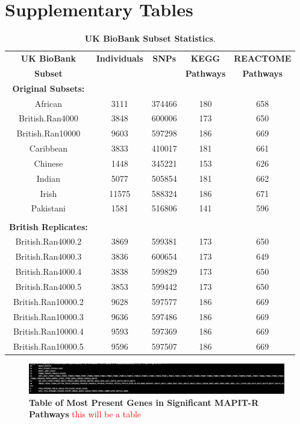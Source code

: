 \documentclass[12pt, a4paper]{article}
\begin{document}
\section{Supplementary Tables}\label{Supplementary-Tables}

\begin{table}[ht]
\centering
\begin{tabular}{ccccc}
  \hline
\textbf{UK BioBank} & \textbf{Individuals} & \textbf{SNPs} & \textbf{KEGG} & \textbf{REACTOME} \\
\textbf{Subset} & & & \textbf{Pathways} & \textbf{Pathways}  \\
  \hline
\textbf{Original Subsets:} & & & & \\
African & 3111 & 374466 & 180 & 658 \\ 
British.Ran4000 & 3848 & 600006 & 173 & 650 \\ 
British.Ran10000 & 9603 & 597298 & 186 & 669 \\ 
Caribbean & 3833 & 410017 & 181 & 661 \\ 
Chinese & 1448 & 345221 & 153 & 626 \\ 
Indian & 5077 & 505854 & 181 & 662 \\ 
Irish & 11575 & 588324 & 186 & 671 \\ 
Pakistani & 1581 & 516806 & 141 & 596 \\ 
\\
\textbf{British Replicates:} & & & & \\
British.Ran4000.2 & 3869 & 599381 & 173 & 650 \\ 
British.Ran4000.3 & 3836 & 600654 & 173 & 649 \\ 
British.Ran4000.4 & 3838 & 599829 & 173 & 650 \\ 
British.Ran4000.5 & 3853 & 599442 & 173 & 650 \\ 
British.Ran10000.2 & 9628 & 597577 & 186 & 669 \\ 
British.Ran10000.3 & 9636 & 597486 & 186 & 669 \\ 
British.Ran10000.4 & 9593 & 597369 & 186 & 669 \\ 
British.Ran10000.5 & 9596 & 597507 & 186 & 669 \\ 
  \hline
\end{tabular}
\caption[TBD]{\textbf{UK BioBank Subset Statistics}. \\ }
\label{InterPath-Supp-Table-UKBPopStats}
\end{table}
\clearpage

\begin{landscape}
\begin{figure}[htbp]
\centering
\hspace*{-2.5cm}
\includegraphics[scale=1]{Images/Supp/InterPath_Supp_Table_TopPathwayGeneCounts.png}
\caption[TBD]{\textbf{Table of Most Present Genes in Significant MAPIT-R Pathways} \textcolor{red}{this will be a table}}
\label{InterPath-Supp-Tables-GeneCounts}
\end{figure}
\end{landscape}
\clearpage
\end{document}
